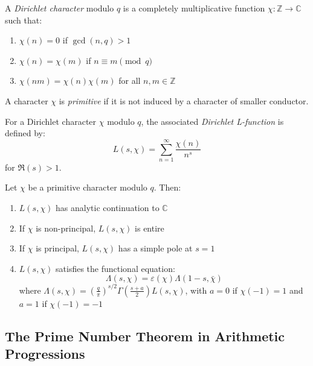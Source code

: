 \begin{definition}
A \emph{Dirichlet character} modulo $q$ is a completely multiplicative function $\chi: \mathbb{Z} \to \mathbb{C}$ such that:
\begin{enumerate}
\item $\chi(n) = 0$ if $\gcd(n,q) > 1$
\item $\chi(n) = \chi(m)$ if $n \equiv m \pmod{q}$
\item $\chi(nm) = \chi(n)\chi(m)$ for all $n,m \in \mathbb{Z}$
\end{enumerate}
A character $\chi$ is \emph{primitive} if it is not induced by a character of smaller conductor.
\end{definition}

\begin{definition}
For a Dirichlet character $\chi$ modulo $q$, the associated \emph{Dirichlet L-function} is defined by:
\begin{equation}
L(s,\chi) = \sum_{n=1}^{\infty} \frac{\chi(n)}{n^s}
\end{equation}
for $\Re(s) > 1$.
\end{definition}

\begin{theorem}
Let $\chi$ be a primitive character modulo $q$. Then:
\begin{enumerate}
\item $L(s,\chi)$ has analytic continuation to $\mathbb{C}$
\item If $\chi$ is non-principal, $L(s,\chi)$ is entire
\item If $\chi$ is principal, $L(s,\chi)$ has a simple pole at $s=1$
\item $L(s,\chi)$ satisfies the functional equation:
\begin{equation}
\Lambda(s,\chi) = \varepsilon(\chi) \Lambda(1-s,\bar{\chi})
\end{equation}
where $\Lambda(s,\chi) = \left(\frac{q}{\pi}\right)^{s/2} \Gamma\left(\frac{s+a}{2}\right) L(s,\chi)$, with $a = 0$ if $\chi(-1) = 1$ and $a = 1$ if $\chi(-1) = -1$
\end{enumerate}
\end{theorem}

\subsection{The Prime Number Theorem in Arithmetic Progressions}

